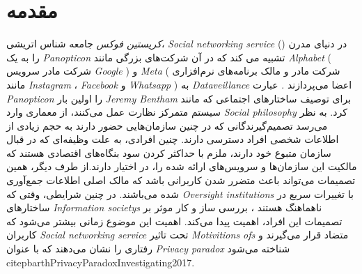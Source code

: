 
\chapter{مقدمه}
\ifDataveillance
  \textit{کریستین فوکس}
  جامعه شناس اتریشی،
  \textit{
    \gls{Social networking service}
  }
  \!({})
  در دنیای مدرن را به یک
  \textit{
    \gls{Panopticon}
  }
  تشبیه می کند   که در آن شرکت‌های بزرگی مانند
  \textit{
    \gls{Alphabet}
  }
  \!(
  شرکت مادر سرویس
  \textit{
    \gls{Google}
  }
  \!)
  و
  \textit{
    \gls{Meta}
  }
  \!(
  \!شرکت مادر و مالک برنامه‌های نرم‌افزاری مانند
  \textit{
    \gls{Instagram}
  }،
  \textit{
    \gls{Facebook}
  }
  و
  \textit{
    \gls{Whatsapp}
  }
  \!)
  به
  \textit{
    \gls{Dataveillance}
  }
  اعضا می‌پردازند
  \!\citep{romelePanopticismNotEnough2017a}.
  عبارت
  \textit{
    \gls{Panopticon}
  }
  را اولین بار
  \textit{
    \gls{Jeremy Bentham}
  }
  \!
  \citep{benthamPanopticonInspectionHouseContaining1791}
  برای توصیف ساختار‌های اجتماعی که مانند سیستم متمرکز نظارت عمل می‌کنند، از معماری وارد
  \textit{
    \gls{Social philosophy}
  }
  کرد.
\fi %
به نظر می‌رسد تصمیم‌گیرندگانی که در چنین سازمان‌هایی حضور دارند به حجم زیادی از اطلاعات
شخصی افراد دسترسی دارند. چنین افرادی، به علت وظیفه‌ای که در قبال سازمان
متبوع خود دارند، ملزم با حداکثر کردن سود بنگاه‌های اقتصادی هستند
که مالکیت این سازمان‌ها و سرویس‌های ارائه شده را، در اختیار
دارند.از طرف دیگر، همین تصمیمات می‌تواند باعث متضرر شدن
کاربرانی باشد که مالک اصلی اطلاعات جمع‌آوری شده می‌باشند. در چنین شرایطی، وقتی که
\textit{
  \glspl{Oversight institution}
}
با تغییرات سریع  در ساختارهای
\textit{
  \glspl{Information society}
}
ناهماهنگ هستند
\!\citep{cavoukianDiscussionPaperPrivacy2009,machovaDiscourseSurveillancePrivacy2021}،
بررسی ساز و کار موثر بر تصمیمات این افراد، اهمیت پیدا می‌کند.
اهمیت  این موضوع زمانی بیشتر می‌شود که کاربران
\textit{
  \gls{Social networking service}
}
تحت تاثیر
\textit{
  \glspl{Motivitions of}
}
متضاد قرار می‌گیرند و رفتاری را نشان می‌دهند که با عنوان
\textit{
  \gls{Privacy paradox}
}
شناخته می‌شود
\!citep{barthPrivacyParadoxInvestigating2017}.


